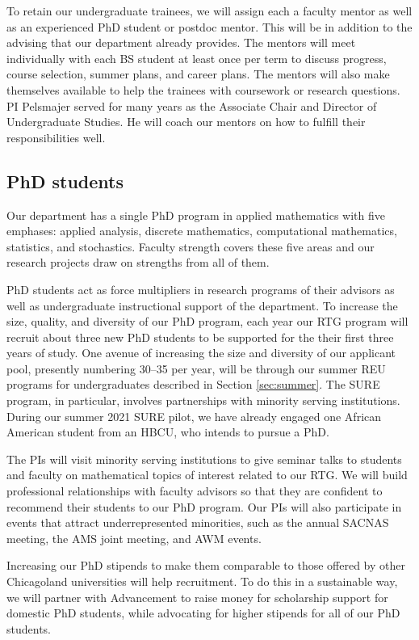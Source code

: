 \documentclass[11pt]{NSFamsart}
\begin{document}
To retain our undergraduate trainees, we will assign each a faculty mentor as well as an experienced PhD student or postdoc mentor.  This will be in addition to the advising that our department already provides.  The mentors will meet individually with each BS student at least once per term to discuss progress, course selection, summer plans, and career plans.  The mentors will also make themselves available to help the trainees with coursework or research questions.  PI Pelsmajer served for many years as the Associate Chair and Director of Undergraduate Studies. He will coach our mentors on how to fulfill their responsibilities well.

\subsection*{PhD students} 
Our department has a single PhD program in applied mathematics with five emphases: applied analysis, discrete mathematics, computational mathematics, statistics, and stochastics.  Faculty strength covers these five areas and our research projects draw on strengths from all of them.

PhD students act as force multipliers in research programs of their advisors as well as undergraduate instructional support of the department. To increase the size, quality, and diversity of our PhD program, each year our RTG program will recruit about three new PhD students to be supported for the their first three years of study.  One avenue of increasing the size and diversity of our applicant pool, presently numbering 30--35 per year, will be through our summer REU programs for undergraduates described in Section \ref{sec:summer}.  The SURE program, in particular, involves partnerships with minority serving institutions.  During our summer 2021 SURE pilot, we have already engaged one African American student from an HBCU, who intends to pursue a PhD.  

The PIs will visit minority serving institutions to give seminar talks to students and faculty on mathematical topics of interest related to our RTG.  We will build professional relationships with faculty advisors so that they are confident to recommend their students to our PhD program.  Our PIs will also participate in events that attract underrepresented minorities, such as the annual SACNAS meeting, the AMS joint meeting, and AWM events.

Increasing our PhD stipends to make them comparable to those offered by other Chicagoland universities will help recruitment. To do this in a sustainable way, we will partner with Advancement to raise money for scholarship support for domestic PhD students, while advocating for higher stipends for all of our PhD students.
\end{document}

